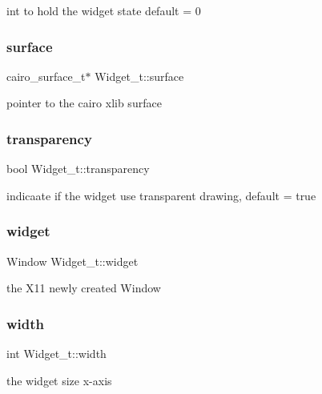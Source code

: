 int to hold the widget state default = 0 \mbox{\label{structWidget__t_ae9b5979742ea31817ff7d7b34a56f88d}} 
\subsubsection{\texorpdfstring{surface}{surface}}
{\footnotesize\ttfamily cairo\+\_\+surface\+\_\+t$\ast$ Widget\+\_\+t\+::surface}

pointer to the cairo xlib surface \mbox{\label{structWidget__t_a42a597c21eca964c0296fc7026feb43b}} 
\subsubsection{\texorpdfstring{transparency}{transparency}}
{\footnotesize\ttfamily bool Widget\+\_\+t\+::transparency}

indicaate if the widget use transparent drawing, default = true \mbox{\label{structWidget__t_acb2bfb41674371ee1220a9d6a2d89fb1}} 
\subsubsection{\texorpdfstring{widget}{widget}}
{\footnotesize\ttfamily Window Widget\+\_\+t\+::widget}

the X11 newly created Window \mbox{\label{structWidget__t_a3204c88196ed5793250b3530dd719037}} 
\subsubsection{\texorpdfstring{width}{width}}
{\footnotesize\ttfamily int Widget\+\_\+t\+::width}

the widget size x-\/axis \mbox{\label{structWidget__t_aac6ce7621b682bb4ce88bac9181c34a7}} 
